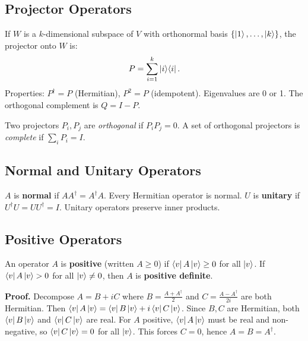 \documentclass[10pt,a4paper]{article}
\begin{document}
\subsection{Projector Operators}

\begin{tcolorbox}[defstyle, title={Definition: Projector}]
If $W$ is a $k$-dimensional subspace of $V$ with orthonormal basis $\{\ket{1},\dots,\ket{k}\}$, the projector onto $W$ is:
\[
P = \sum_{i=1}^{k}\ket{i}\!\bra{i}.
\]
Properties: $P^\dagger=P$ (Hermitian), $P^2=P$ (idempotent). Eigenvalues are 0 or 1. The orthogonal complement is $Q=I-P$.
\end{tcolorbox}

Two projectors $P_i,P_j$ are \emph{orthogonal} if $P_iP_j=0$. A set of orthogonal projectors is \emph{complete} if $\sum_i P_i=I$.

\subsection{Normal and Unitary Operators}

\begin{tcolorbox}[defstyle, title={Definition: Normal and Unitary Operators}]
$A$ is \textbf{normal} if $AA^\dagger=A^\dagger A$. Every Hermitian operator is normal. $U$ is \textbf{unitary} if $U^\dagger U=UU^\dagger=I$. Unitary operators preserve inner products.
\end{tcolorbox}

\subsection{Positive Operators}

\begin{tcolorbox}[defstyle, title={Definition: Positive Operator}]
An operator $A$ is \textbf{positive} (written $A\ge 0$) if $\bra{v}A\ket{v}\ge 0$ for all $\ket{v}$. If $\bra{v}A\ket{v}>0$ for all $\ket{v}\neq 0$, then $A$ is \textbf{positive definite}.
\end{tcolorbox}

\begin{tcolorbox}[propstyle, title={Theorem: A Positive Operator Is Hermitian}]
\textbf{Proof.} Decompose $A=B+iC$ where $B=\frac{A+A^\dagger}{2}$ and $C=\frac{A-A^\dagger}{2i}$ are both Hermitian. Then $\bra{v}A\ket{v}=\bra{v}B\ket{v}+i\bra{v}C\ket{v}$. Since $B,C$ are Hermitian, both $\bra{v}B\ket{v}$ and $\bra{v}C\ket{v}$ are real. For $A$ positive, $\bra{v}A\ket{v}$ must be real and non-negative, so $\bra{v}C\ket{v}=0$ for all $\ket{v}$. This forces $C=0$, hence $A=B=A^\dagger$.
\end{tcolorbox}
\end{document}
